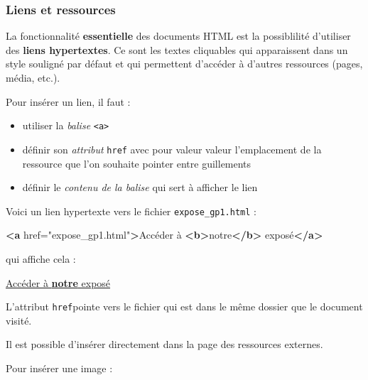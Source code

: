 \documentclass[a4paper,17pt]{extarticle}
\providecommand{\tightlist}{%
      \setlength{\itemsep}{0pt}\setlength{\parskip}{0pt}}
\newenvironment{Shaded}{}{}
\newcommand{\KeywordTok}[1]{\textcolor[rgb]{0.00,0.44,0.13}{\textbf{{#1}}}}
\newcommand{\StringTok}[1]{\textcolor[rgb]{0.25,0.44,0.63}{{#1}}}
\newcommand{\OtherTok}[1]{\textcolor[rgb]{0.00,0.44,0.13}{{#1}}}
\newcommand{\NormalTok}[1]{{#1}}
\begin{document}
    \hypertarget{liens-et-ressources}{%
\subsubsection{Liens et ressources}\label{liens-et-ressources}}

    La fonctionnalité \textbf{essentielle} des documents HTML est la
possiblilité d'utiliser des \textbf{liens hypertextes}. Ce sont les
textes cliquables qui apparaissent dans un style souligné par défaut et
qui permettent d'accéder à d'autres ressources (pages, média, etc.).

Pour insérer un lien, il faut :

\begin{itemize}
\tightlist
\item
  utiliser la \emph{balise} \texttt{\textless{}a\textgreater{}}
\item
  définir son \emph{attribut} \texttt{href} avec pour valeur valeur
  l'emplacement de la ressource que l'on souhaite pointer entre
  guillements
\item
  définir le \emph{contenu de la balise} qui sert à afficher le lien
\end{itemize}
\begin{exemple}
    Voici un lien hypertexte vers le fichier \texttt{expose\_gp1.html} :

\begin{Shaded}
\begin{Highlighting}[]
\KeywordTok{<a}\OtherTok{ href=}\StringTok{"expose_gp1.html"}\KeywordTok{>}\NormalTok{Accéder à }\KeywordTok{<b>}\NormalTok{notre}\KeywordTok{</b>}\NormalTok{ exposé}\KeywordTok{</a>}
\end{Highlighting}
\end{Shaded}

qui affiche cela :

\href{expose_gp1.html}{Accéder à \textbf{notre} exposé}

L'attribut \texttt{href}pointe vers le fichier qui est dans le même
dossier que le document visité.

            \end{exemple}
    Il est possible d'insérer directement dans la page des ressources
externes.

Pour insérer une image :
\end{document}
